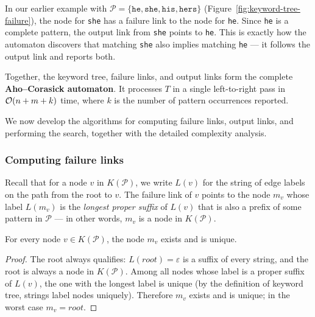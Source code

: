 In our earlier example with
$\mathcal{P} = \{\texttt{he},\texttt{she},\texttt{his},\texttt{hers}\}$
(Figure~\ref{fig:keyword-tree-failure}), the node for \texttt{she} has
a failure link to the node for \texttt{he}.
Since \texttt{he} is a complete pattern, the output link from
\texttt{she} points to \texttt{he}.
This is exactly how the automaton discovers that matching \texttt{she}
also implies matching \texttt{he} --- it follows the output link and
reports both.


Together, the keyword tree, failure links, and output links form the
complete \textbf{Aho--Corasick automaton}.
It processes $T$ in a single left-to-right pass in $\mathcal{O}\!\left(n + m + k\right)$
time, where $k$ is the number of pattern occurrences reported.

We now develop the algorithms for computing failure links, output links,
and performing the search, together with the detailed complexity analysis.

\subsubsection{Computing failure links}

Recall that for a node $v$ in $K(\mathcal{P})$, we write $L(v)$ for
the string of edge labels on the path from the root to $v$.
The failure link of $v$ points to the node $m_v$ whose label $L(m_v)$
is the \emph{longest proper suffix} of $L(v)$ that is also a prefix
of some pattern in $\mathcal{P}$ --- in other words, $m_v$ is a node
in $K(\mathcal{P})$.

\begin{lemma}
  \label{lem:failure-unique}
  For every node $v \in K(\mathcal{P})$, the node $m_v$ exists and is
  unique.
\end{lemma}
\begin{proof}
  The root always qualifies: $L(root) = \varepsilon$ is a suffix of
  every string, and the root is always a node in $K(\mathcal{P})$.
  Among all nodes whose label is a proper suffix of $L(v)$, the one
  with the longest label is unique (by the definition of keyword tree,
  strings label nodes uniquely).
  Therefore $m_v$ exists and is unique; in the worst case
  $m_v = root$.
\end{proof}

